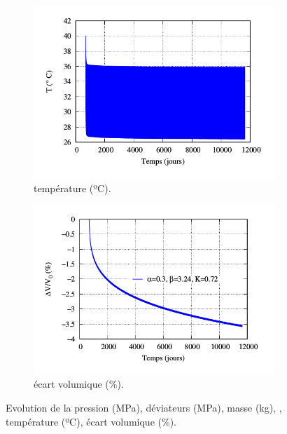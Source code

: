 \documentclass[11pt,french,a4paper]{article}
\begin{document}
\begin{figure}[h!]
    \begin{subfigure}[b]{0.42\linewidth}
        \includegraphics[width=\linewidth]{image/annexe/cav_sal/P2M_bon/T.png}
        \caption{température (ºC).}
    \end{subfigure}
    \begin{subfigure}[b]{0.42\linewidth}
        \includegraphics[width=\linewidth]{image/annexe/cav_sal/P2M_bon/Delta_vol_(1).png}
        \caption{écart volumique (\%).}
    \end{subfigure}
    \caption{Evolution de la pression (MPa), déviateurs (MPa), masse (kg), , température (ºC), écart volumique (\%). }
    
    \end{figure}
    
\end{document}
